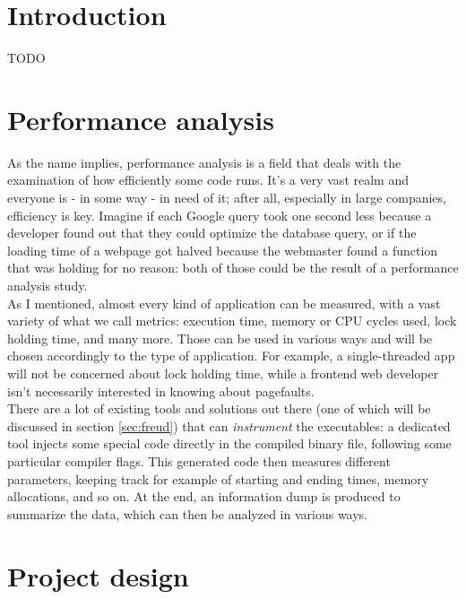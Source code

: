 \chapter{Introduction}

    TODO


\chapter{Performance analysis}


    As the name implies, performance analysis is a field that deals with the examination of
    how efficiently some code runs. It's a very vast realm and everyone is - in some
    way - in need of it; after all, especially in large companies, efficiency is key. Imagine if
    each Google query took one second less because a developer found out that they could
    optimize the database query, or if the loading time of a webpage got halved because the
    webmaster found a function that was holding for no reason: both of those could be the result
    of a performance analysis study.\\

    As I mentioned, almost every kind of application can be measured, with a vast variety of what we call metrics:
    execution time, memory or CPU cycles used, lock holding time, and many more. Those can be used in
    various ways and will be chosen accordingly to the type of application. For example, a single-threaded app
    will not be concerned about lock holding time, while a frontend web developer isn't 
    necessarily interested in knowing about pagefaults.\\

    There are a lot of existing tools and solutions out there (one of which will be discussed in section \ref{sec:freud})
    that can \textit{instrument} the executables: a dedicated tool injects some special code directly in the compiled
    binary file, following some particular compiler flags. This generated code then measures
    different parameters, keeping track for example of starting and ending times, memory allocations, and so on.
    At the end, an information dump is produced to summarize the data, which can then be analyzed in various ways.


\chapter{Project design}

